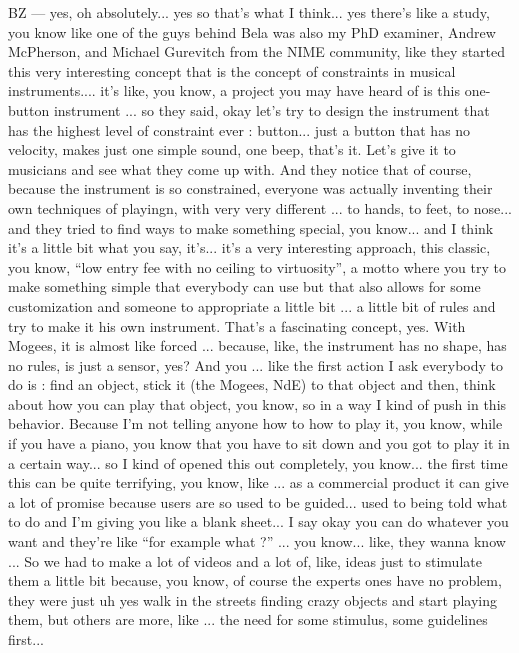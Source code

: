 BZ — yes, oh absolutely...  yes so that's what I think... yes there's like a study, you know like one of the guys behind Bela was also my PhD examiner, Andrew McPherson, and Michael Gurevitch from the NIME community, like they started this very interesting concept that is the concept of constraints in musical instruments.... it's like, you know, a project you may have heard of is this one-button instrument ... so they said, okay let's try to design the instrument that has the highest level of constraint ever : button... just a button that has no velocity, makes just one simple sound, one beep, that's it. Let's give it to musicians and see what they come up with. And they notice that of course, because the instrument is so constrained, everyone was actually inventing their own techniques of playingn, with very very different ... to hands, to feet, to nose... and they tried to find ways to make something special, you know...  and I think it's a little bit what you say, it's... it's a very interesting approach, this classic, you know, ``low entry fee with no ceiling to virtuosity'', a motto where you try to make something simple that everybody can use but that also allows for some customization and someone to appropriate a little bit ... a little bit of rules and try to make it his own instrument. That's a fascinating concept, yes. With Mogees, it is almost like forced ... because, like, the instrument has no shape, has no rules, is just a sensor, yes? And you ... like the first action I ask everybody to do is : find an object, stick it (the Mogees, NdE) to that object and then, think about how you can play that object, you know, so in a way I kind of push in this behavior. Because I'm not telling anyone how to how to play it, you know, while if you have a piano, you know that you have to sit down and you got to play it in a certain way... so I kind of opened this out completely, you know...  the first time this can be quite terrifying, you know, like ... as a commercial product it can give a lot of promise because users are so used to be guided... used to being told what to do and I'm giving you like a blank sheet... I say okay you can do whatever you want and they're like ``for example what ?'' ... you know... like, they wanna know ... So we had to make a lot of videos and a lot of, like, ideas just to stimulate them a little bit because, you know, of course the experts ones have no problem, they were just uh yes walk in the streets finding crazy objects and start playing them, but others are more, like ... the need for some stimulus, some guidelines first... 

